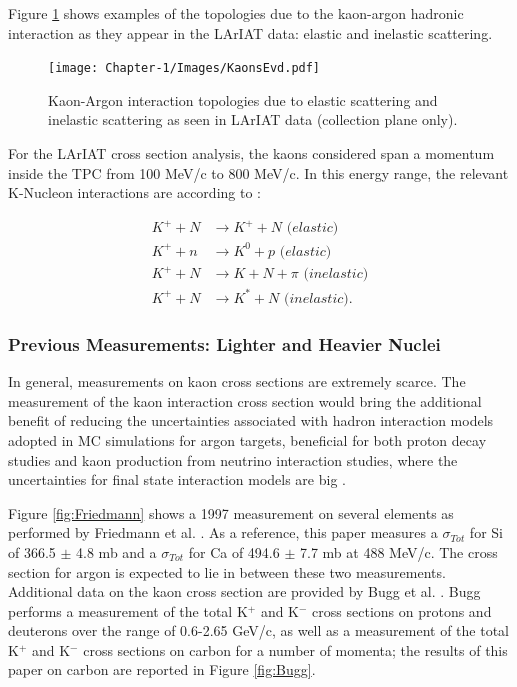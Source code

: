 Figure \ref{fig:KaonsEvd} shows examples of the topologies due to the kaon-argon hadronic interaction as they appear in the  LArIAT data: elastic and inelastic scattering.

\begin{figure}[hbpt]
\centering
\texttt{[image: Chapter-1/Images/KaonsEvd.pdf]}
\caption{Kaon-Argon interaction topologies due to elastic scattering and inelastic scattering as seen in LArIAT data (collection plane only).}
\label{fig:KaonsEvd}
\end{figure}


For the LArIAT cross section analysis, the kaons considered span a momentum inside the TPC from 100 MeV/c to 800 MeV/c. In this energy range, the relevant K-Nucleon interactions are according to \cite{fesbach1992theoretical}:

\begin{align}
K^{+} + N &\rightarrow K^{+} + N\textit{ (elastic)}\\
K^{+} + n &\rightarrow K^{0} + p\textit{ (elastic)}\\
K^{+} + N &\rightarrow K + N + \pi \textit{ (inelastic)}\\
K^{+} + N &\rightarrow K^{*} + N\textit{ (inelastic)}.
\end{align}

\subsubsection{Previous Measurements: Lighter and Heavier Nuclei}
In general, measurements on kaon cross sections are  extremely scarce. The measurement of the kaon interaction cross section would bring the additional benefit of reducing the uncertainties associated  with hadron interaction models adopted in MC simulations for argon targets, beneficial for both proton decay studies and kaon production from neutrino interaction studies, where the  uncertainties for final state interaction models are big \cite{Drakoulakos:2004gn}. 

Figure \ref{fig:Friedmann} shows a 1997 measurement on several elements as performed by  Friedmann et al.  \cite{Friedman:1997eq}. As a reference, this paper measures a $\sigma_{Tot}$ for Si of  366.5  $\pm$  4.8 mb and a $\sigma_{Tot}$ for Ca of 494.6  $\pm$ 7.7 mb at 488 MeV/c.  The cross section for argon is expected to lie in between these two measurements. 
Additional data on the kaon cross section are provided by Bugg et al. \cite{PhysRev.168.1466}. Bugg performs a measurement of the total 
K$^+$ and K$^-$ cross sections on protons and deuterons over the range of 0.6-2.65 GeV/c, as well as a measurement of the total K$^+$ and K$^-$  cross sections on carbon for a number of momenta; the results of this paper on carbon are reported in Figure \ref{fig:Bugg}.



